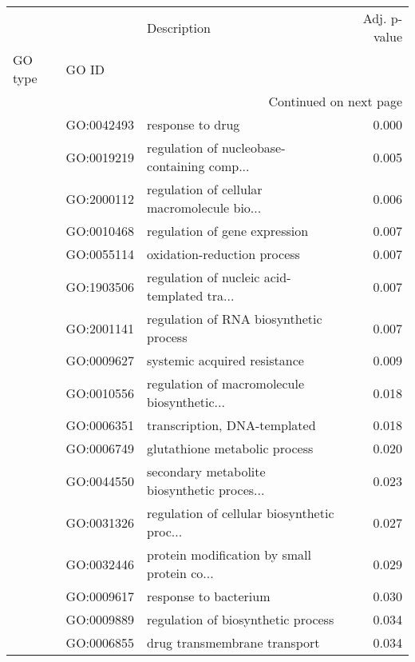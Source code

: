 \begin{longtable}{lllr}
\toprule
   &            &                                  Description &  Adj. p-value \\
GO type & GO ID &                                              &               \\
\midrule
\endhead
\midrule
\multicolumn{4}{r}{{Continued on next page}} \\
\midrule
\endfoot

\bottomrule
\endlastfoot
\multirow{26}{*}{BP} & GO:0042493 &                             response to drug &         0.000 \\
   & GO:0019219 &  regulation of nucleobase-containing comp... &         0.005 \\
   & GO:2000112 &  regulation of cellular macromolecule bio... &         0.006 \\
   & GO:0010468 &                regulation of gene expression &         0.007 \\
   & GO:0055114 &                  oxidation-reduction process &         0.007 \\
   & GO:1903506 &  regulation of nucleic acid-templated tra... &         0.007 \\
   & GO:2001141 &       regulation of RNA biosynthetic process &         0.007 \\
   & GO:0009627 &                 systemic acquired resistance &         0.009 \\
   & GO:0010556 &  regulation of macromolecule biosynthetic... &         0.018 \\
   & GO:0006351 &                 transcription, DNA-templated &         0.018 \\
   & GO:0006749 &                glutathione metabolic process &         0.020 \\
   & GO:0044550 &  secondary metabolite biosynthetic proces... &         0.023 \\
   & GO:0031326 &  regulation of cellular biosynthetic proc... &         0.027 \\
   & GO:0032446 &  protein modification by small protein co... &         0.029 \\
   & GO:0009617 &                        response to bacterium &         0.030 \\
   & GO:0009889 &           regulation of biosynthetic process &         0.034 \\
   & GO:0006855 &                 drug transmembrane transport &         0.034 \\

\end{longtable}
